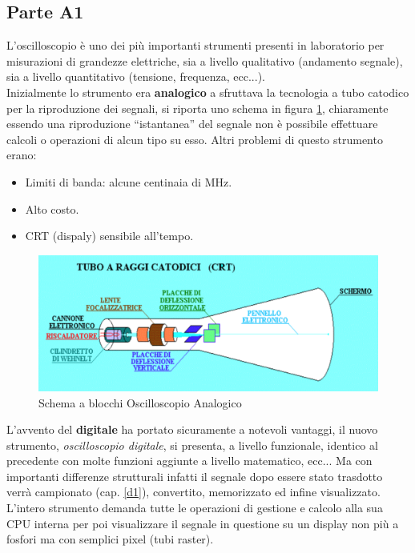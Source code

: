 \documentclass[12pt]{article}
\begin{document}
\subsection{Parte A1}\label{A1} %
L'oscilloscopio è uno dei più importanti strumenti presenti in laboratorio per misurazioni di grandezze elettriche, sia a livello qualitativo (andamento segnale), sia a livello quantitativo (tensione, frequenza, ecc...).\\
Inizialmente lo strumento era \textbf{analogico} a sfruttava la tecnologia a tubo catodico per la riproduzione dei segnali, si riporta uno schema in figura \ref{fig:osc_analog}, chiaramente essendo una riproduzione ``istantanea'' del segnale non è possibile effettuare calcoli o operazioni di alcun tipo su esso. Altri problemi di questo strumento erano:
\begin{itemize}
  \item Limiti di banda: alcune centinaia di MHz.
  \item Alto costo.
  \item CRT (dispaly) sensibile all'tempo.
\end{itemize}

\begin{figure}[!hpt]
  \includegraphics[width=\textwidth]{images/osc_analog.png}
  \caption{Schema a blocchi Oscilloscopio Analogico}
  \label{fig:osc_analog}
\end{figure}

L'avvento del \textbf{digitale} ha portato sicuramente a notevoli vantaggi, il nuovo strumento, \textit{oscilloscopio digitale}, si presenta, a livello funzionale, identico al precedente con molte funzioni aggiunte a livello matematico, ecc... Ma con importanti differenze strutturali infatti il segnale dopo essere stato trasdotto verrà campionato (cap. \ref{d1}), convertito, memorizzato ed infine visualizzato.\\
L'intero strumento demanda tutte le operazioni di gestione e calcolo alla sua CPU interna per poi visualizzare il segnale in questione su un display non più a fosfori ma con semplici pixel (tubi raster).
\end{document}
